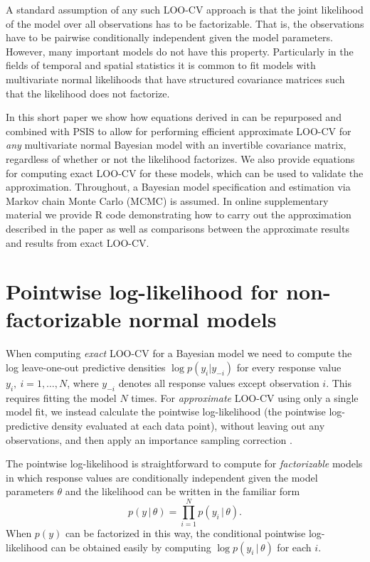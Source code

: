 \documentclass[11pt]{article}
\begin{document}
A standard assumption of any such LOO-CV approach is that the joint likelihood
of the model over all observations has to be factorizable. That is, the
observations have to be pairwise conditionally independent given the model
parameters. However, many important models do not have this property.
Particularly in the fields of temporal and spatial statistics it is common to
fit models with multivariate normal likelihoods that have structured covariance
matrices such that the likelihood does not factorize.

In this short paper we show how equations derived in \cite{sundararajan2001} can
be repurposed and combined with PSIS to allow for performing efficient
approximate LOO-CV for \emph{any} multivariate normal Bayesian model with an
invertible covariance matrix, regardless of whether or not the likelihood
factorizes. We also provide equations for computing exact LOO-CV for these
models, which can be used to validate the approximation. Throughout, a Bayesian
model specification and estimation via Markov chain Monte Carlo (MCMC) is
assumed. In online supplementary material we provide R code demonstrating how to
carry out the approximation described in the paper as well as comparisons
between the approximate results and results from exact LOO-CV.


\section{Pointwise log-likelihood for non-factorizable normal models}
\label{sec-pointwise}

When computing \emph{exact} LOO-CV for a Bayesian model we need to compute the
log leave-one-out predictive densities $\log{p(y_i | y_{-i})}$ for every
response value $y_i, \: i = 1, \ldots, N$, where $y_{-i}$ denotes all response
values except observation $i$. This requires fitting the model $N$ times. For
\emph{approximate} LOO-CV using only a single model fit, we instead calculate
the pointwise log-likelihood (the pointwise log-predictive density evaluated at
each data point), without leaving out any observations, and then apply an
importance sampling correction \citep{vehtari2017loo}.

The pointwise log-likelihood is straightforward to compute for
\emph{factorizable} models in which response values are conditionally
independent given the model parameters $\theta$ and the likelihood can be
written in the familiar form
%
\begin{equation}
p(y \,|\, \theta) = \prod_{i=1}^N p(y_i \,|\, \theta).
\end{equation}
%
When $p(y)$ can be factorized in this way, the conditional pointwise
log-likelihood can be obtained easily by computing $\log p(y_i \,|\, \theta)$
for each $i$.
\end{document}
